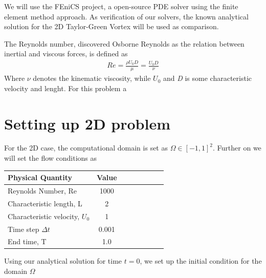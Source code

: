 \documentclass[a4paper,norsk]{article}
\begin{document}
We will use the FEniCS project, a open-source PDE solver using the finite element method approach.
As verification of our solvers, the known analytical solution for the 2D Taylor-Green Vortex will be used as comparison.

The Reynolds number, discovered Osborne Reynolds as the relation between inertial and viscous forces, is defined
as
\begin{align}
Re = \frac{\rho U_{0} D}{\mu} = \frac{U_{0} D}{\nu}
\end{align}
Where $\nu$ denotes the kinematic viscosity, while $U_{0}$ and \textit{D} is some characteristic velocity and lenght.
For this problem a

\section*{Setting up 2D problem}

For the 2D case, the computational domain is set as $\Omega \in [-1, 1]^2$. Further on we will set
the flow conditions as \\

\begin{tabular}{l*{6}{c}r}
Physical Quantity              & Value  \\
\hline
Reynolds Number, Re & 1000   \\
Characteristic length, L           & 2     \\
Characteristic velocity, $U_{0}$   & 1     \\
Time step $\Delta t$ 			   & 0.001 \\
End time, T 					   & 1.0
\end{tabular}

Using our analytical solution for time $t = 0$, we set up the initial condition
for the domain $\Omega$
\end{document}
